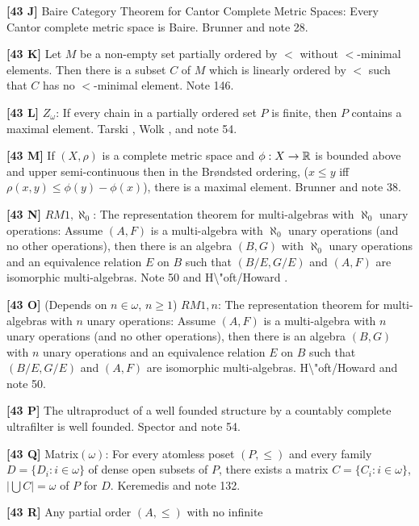 \smallskip
\item{}{\bf [43 J]}  Baire Category Theorem for Cantor Complete Metric
Spaces: Every Cantor complete metric space is Baire.
\ac{Brunner} \cite{1983c} and note 28.
\smallskip
\item{}{\bf [43 K]}  Let $M$ be a non-empty set partially ordered
by $<$ without $<$-minimal elements.  Then there is a subset $C$
of $M$ which is linearly ordered by $<$ such that $C$ has no
$<$-minimal element.  Note 146.
\smallskip
\item{}{\bf [43 L]}  $Z_{\omega}$: If every chain in a partially ordered
set $P$ is finite, then $P$ contains a maximal element.
\ac{Tarski} \cite{1948}, \ac{Wolk} \cite{1983}, and note 54.
\smallskip
\item{}{\bf [43 M]} If $(X,\rho)$ is a complete metric space and $\phi:
X\rightarrow {\Bbb R}$ is bounded above and upper semi-continuous then in
the Br\o ndsted ordering, ($x\le y$ iff $\rho(x,y)\le\phi(y)-\phi(x)$),
there is a  maximal element.  \ac{Brunner} \cite{1987a} and note 38.
\smallskip
\item{}{\bf [43 N]} $RM1,\aleph_{0}$:  The representation theorem for
multi-algebras with $\aleph_{0}$ unary operations: Assume $(A,F)$ is a
multi-algebra with $\aleph_{0}$ unary operations (and no other operations),
then there is an algebra $(B,G)$ with $\aleph_{0}$ unary operations and
an equivalence relation $E$ on $B$ such that $(B/E,G/E)$ and $(A,F)$ are
isomorphic multi-algebras.  Note 50 and \ac{H\"oft/Howard} \cite{1981}.
\smallskip
\item{}{\bf [43 O]} (Depends on $n\in \omega$, $n\ge 1$) $RM1,n$:  The
representation theorem for multi-algebras with $n$ unary operations:
Assume $(A,F)$ is a multi-algebra with $n$ unary operations (and no
other operations), then there is an algebra $(B,G)$ with $n$ unary
operations and an equivalence relation $E$ on $B$ such that $(B/E,G/E)$
and $(A,F)$ are isomorphic multi-algebras.  \ac{H\"oft/Howard}
\cite{1981} and note 50.
\smallskip
\item{}{\bf [43 P]}  The ultraproduct of a well founded structure by a
countably complete ultrafilter is well founded. \ac{Spector} \cite{1980}
and note 54.
\smallskip
\item{}{\bf [43 Q]} Matrix$(\omega)$: For every atomless poset $(P,\le)$
and every family $D=\{D_i: i\in\omega\}$ of dense open subsets of $P$,
there exists a matrix $C=\{C_i: i\in\omega\}$, $|\bigcup C|=\omega$ of $P$
for $D$.  \ac{Keremedis} \cite{1996b} and note 132.
\smallskip
\item{}{\bf [43 R]}  Any partial order $(A,\le)$ with no infinite
